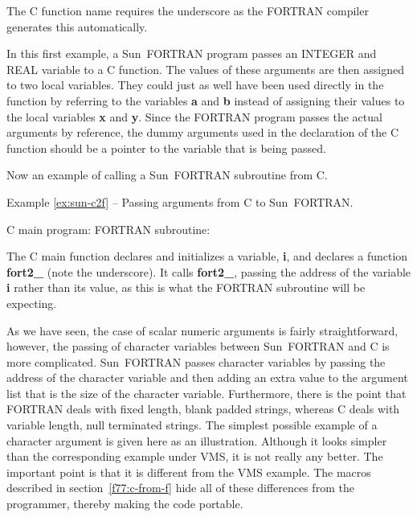 The C function name requires the underscore as the FORTRAN compiler generates
this automatically. 

In this first example, a Sun~FORTRAN program passes an INTEGER and REAL
variable to a C function. The values of these arguments are then assigned to
two local variables. They could just as well have been used directly in the
function by referring to the variables {\tt *}{\bf a} and {\tt *}{\bf b}
instead of assigning their values to the local variables {\bf x} and {\bf y}. 
Since the FORTRAN program passes the actual arguments by reference, the dummy
arguments used in the declaration of the C function should be a pointer to the
variable that is being passed.

Now an example of calling a Sun~FORTRAN subroutine from C.

\label{ex:sun-c2f}
\begin{center}
Example \ref{ex:sun-c2f} -- Passing arguments from C to Sun~FORTRAN.
\end{center}
\nopagebreak[4]
C main program:
\pagebreak[1]
FORTRAN subroutine:

The C main function declares and initializes a variable, {\bf i}, and declares
a function {\bf fort2\_} (note the underscore). It calls {\bf fort2\_}, passing
the address of the variable {\bf i} rather than its value, as this is what the
FORTRAN subroutine will be expecting.

As we have seen, the case of scalar numeric arguments is fairly
straightforward, however, the passing of character variables between Sun~FORTRAN
and C is more complicated. Sun~FORTRAN passes character variables by passing the
address of the character variable and then adding an extra value to the
argument list that is the size of the character variable.  Furthermore, there
is the point that FORTRAN deals with fixed length, blank padded strings,
whereas C deals with variable length, null terminated strings. The simplest
possible example of a character argument is given here as an illustration.
Although it looks simpler than the corresponding example under VMS, it is not
really any better. The important point is that it is different from the VMS
example. The macros described in section~\ref{f77:c-from-f} hide all of these
differences from the programmer, thereby making the code portable.

